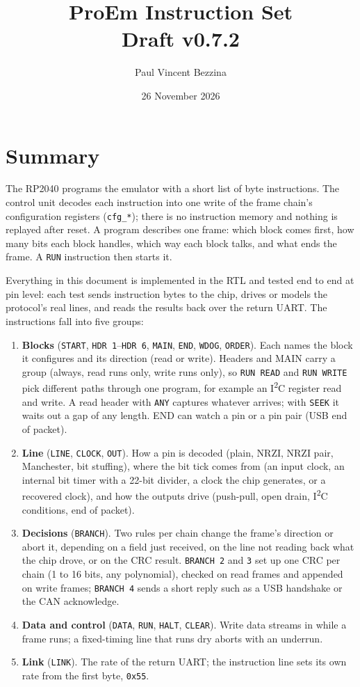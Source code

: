 \documentclass[11pt,a4paper]{article}
\title{ProEm Instruction Set\\\large Draft v0.7.2}
\author{Paul Vincent Bezzina}
\date{26 November 2026}
\newcommand{\sig}[1]{\texttt{#1}}
\begin{document}
\maketitle

\section{Summary}

The RP2040 programs the emulator with a short list of byte instructions. The control unit decodes each instruction into one write of the frame chain's configuration registers (\sig{cfg\_*}); there is no instruction memory and nothing is replayed after reset. A program describes one frame: which block comes first, how many bits each block handles, which way each block talks, and what ends the frame. A \sig{RUN} instruction then starts it.

Everything in this document is implemented in the RTL and tested end to end at pin level: each test sends instruction bytes to the chip, drives or models the protocol's real lines, and reads the results back over the return UART. The instructions fall into five groups:

\begin{enumerate}
\item \textbf{Blocks} (\sig{START}, \sig{HDR 1}--\sig{HDR 6}, \sig{MAIN}, \sig{END}, \sig{WDOG}, \sig{ORDER}). Each names the block it configures and its direction (read or write). Headers and MAIN carry a group (always, read runs only, write runs only), so \sig{RUN READ} and \sig{RUN WRITE} pick different paths through one program, for example an I\textsuperscript{2}C register read and write. A read header with \sig{ANY} captures whatever arrives; with \sig{SEEK} it waits out a gap of any length. END can watch a pin or a pin pair (USB end of packet).
\item \textbf{Line} (\sig{LINE}, \sig{CLOCK}, \sig{OUT}). How a pin is decoded (plain, NRZI, NRZI pair, Manchester, bit stuffing), where the bit tick comes from (an input clock, an internal bit timer with a 22-bit divider, a clock the chip generates, or a recovered clock), and how the outputs drive (push-pull, open drain, I\textsuperscript{2}C conditions, end of packet).
\item \textbf{Decisions} (\sig{BRANCH}). Two rules per chain change the frame's direction or abort it, depending on a field just received, on the line not reading back what the chip drove, or on the CRC result. \sig{BRANCH 2} and \sig{3} set up one CRC per chain (1 to 16 bits, any polynomial), checked on read frames and appended on write frames; \sig{BRANCH 4} sends a short reply such as a USB handshake or the CAN acknowledge.
\item \textbf{Data and control} (\sig{DATA}, \sig{RUN}, \sig{HALT}, \sig{CLEAR}). Write data streams in while a frame runs; a fixed-timing line that runs dry aborts with an underrun.
\item \textbf{Link} (\sig{LINK}). The rate of the return UART; the instruction line sets its own rate from the first byte, \texttt{0x55}.
\end{enumerate}
\end{document}
